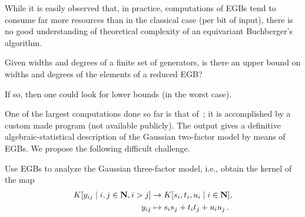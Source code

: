 
While it is easily observed that, in practice, computations of EGBs tend to consume far more resources than in the classical case (per bit of input), there is no good understanding of theoretical complexity of an equivariant Buchberger's algorithm.

\begin{question}
Given widths and degrees of a finite set of generators, is there an upper bound on widths and degrees of the elements of a reduced EGB?

If so, then one could look for lower bounds (in the worst case). 
\end{question}






One of the largest computations done so far is that of~\cite{Brouwer09e}; it is accomplished by a custom made program (not available publicly). The output gives a definitive algebraic-statistical description of the Gaussian two-factor model by means of EGBs.  We propose the following difficult challenge.

\begin{problem}
Use EGBs to analyze the Gaussian three-factor model, i.e., obtain the kernel of the map
\begin{align*} 
K[y_{ij} \mid i,j \in \mathbf N, i > j] &\to K[s_i,t_i,u_i \mid i \in \mathbf N],\\ 
y_{ij} &\mapsto s_is_j + t_it_j + u_iu_j\,.
\end{align*}
\end{problem} 


